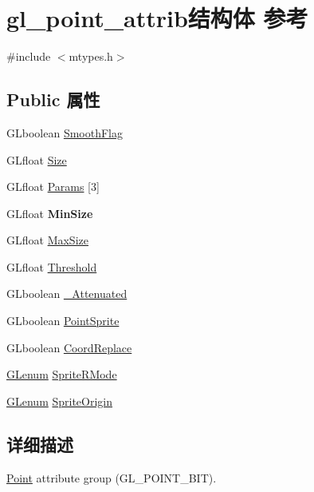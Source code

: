 \hypertarget{structgl__point__attrib}{}\section{gl\+\_\+point\+\_\+attrib结构体 参考}
\label{structgl__point__attrib}


{\ttfamily \#include $<$mtypes.\+h$>$}

\subsection*{Public 属性}
\begin{DoxyCompactItemize}
\item 
G\+Lboolean \hyperlink{structgl__point__attrib_a1b91e7278b349f4499ad5ffe992cbbb1}{Smooth\+Flag}
\item 
G\+Lfloat \hyperlink{structgl__point__attrib_a68c6ff38becdf8d5f8f3f62a0af253e2}{Size}
\item 
G\+Lfloat \hyperlink{structgl__point__attrib_ad08eeee48ea8d483e2db96704d767e1a}{Params} \mbox{[}3\mbox{]}
\item 
\mbox{\label{structgl__point__attrib_a1d7f35c693d1afb9a4144d7817718e00}} 
G\+Lfloat {\bfseries Min\+Size}
\item 
G\+Lfloat \hyperlink{structgl__point__attrib_ae5764cd121a2b7c1195f3c0bc94992b1}{Max\+Size}
\item 
G\+Lfloat \hyperlink{structgl__point__attrib_a4b06d29b0c143b8a22ec651c227ceaec}{Threshold}
\item 
G\+Lboolean \hyperlink{structgl__point__attrib_a95b4a28a06b54ea8d2080ed604f3e7c3}{\+\_\+\+Attenuated}
\item 
G\+Lboolean \hyperlink{structgl__point__attrib_a0759a2dfc785cc10058c710596c3ae3e}{Point\+Sprite}
\item 
G\+Lboolean \hyperlink{structgl__point__attrib_a0ff4797fbf44330beee225ffd1bf5438}{Coord\+Replace}
\item 
\hyperlink{interfacevoid}{G\+Lenum} \hyperlink{structgl__point__attrib_af28e863ac779b2efb028cd0847709091}{Sprite\+R\+Mode}
\item 
\hyperlink{interfacevoid}{G\+Lenum} \hyperlink{structgl__point__attrib_a2880cf71a4362618d19b9132b023cc01}{Sprite\+Origin}
\end{DoxyCompactItemize}


\subsection{详细描述}
\hyperlink{struct_point}{Point} attribute group (G\+L\+\_\+\+P\+O\+I\+N\+T\+\_\+\+B\+IT). 

